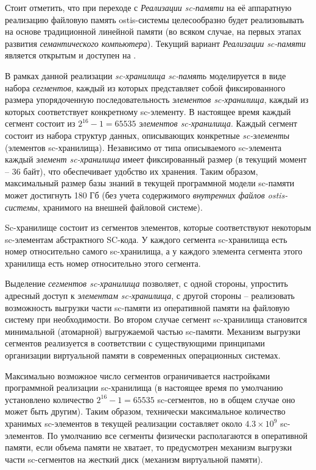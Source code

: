 Стоит отметить, что при переходе с \textit{Реализации sc-памяти} на её аппаратную реализацию файловую память ostis-системы целесообразно будет реализовывать на основе традиционной линейной памяти (во всяком случае, на первых этапах развития \textit{семантического компьютера}). Текущий вариант \textit{Реализации sc-памяти} является открытым и доступен на \cite{sc-machine}.

В рамках данной реализации \textit{sc-хранилища} \textit{sc-память} моделируется в виде набора \textit{сегментов}, каждый из которых представляет собой фиксированного размера упорядоченную последовательность \textit{элементов sc-хранилища}, каждый из которых соответствует конкретному sc-элементу. В настоящее время каждый сегмент состоит из $2^{16}-1=65535$ \textit{элементов sc-хранилища}. Каждый сегмент состоит из набора структур данных, описывающих конкретные \textit{sc-элементы} (элементов sc-хранилища). Независимо от типа описываемого sc-элемента каждый \textit{элемент sc-хранилища} имеет фиксированный размер (в текущий момент -- 36 байт), что обеспечивает удобство их хранения. Таким образом, максимальный размер базы знаний в текущей программной модели sc-памяти может достигнуть 180 Гб (без учета содержимого \textit{внутренних файлов ostis-системы}, хранимого на внешней файловой системе).

Sc-хранилище состоит из сегментов элементов, которые соответствуют некоторым sc-элементам абстрактного SC-кода. У каждого сегмента sc-хранилища есть номер относительно самого sc-хранилища, а у каждого элемента сегмента этого хранилища есть номер относительно этого сегмента.

Выделение \textit{сегментов sc-хранилища} позволяет, с одной стороны, упростить адресный доступ к \textit{элементам sc-хранилища}, с другой стороны -- реализовать возможность выгрузки части sc-памяти из оперативной памяти на файловую систему при необходимости. Во втором случае сегмент sc-хранилища становится минимальной (атомарной) выгружаемой частью sc-памяти. Механизм выгрузки сегментов реализуется в соответствии с существующими принципами организации виртуальной памяти в современных операционных системах.

Максимально возможное число сегментов ограничивается настройками программной реализации sc-хранилища (в настоящее время по умолчанию установлено количество $2^{16}-1=65535$ sc-сегментов, но в общем случае оно может быть другим). Таким образом, технически максимальное количество хранимых sc-элементов в текущей реализации составляет около $4.3 \times 10^{9}$ sc-элементов. По умолчанию все сегменты физически располагаются в оперативной памяти, если объема памяти не хватает, то предусмотрен механизм выгрузки части sc-сегментов на жесткий диск (механизм виртуальной памяти).

